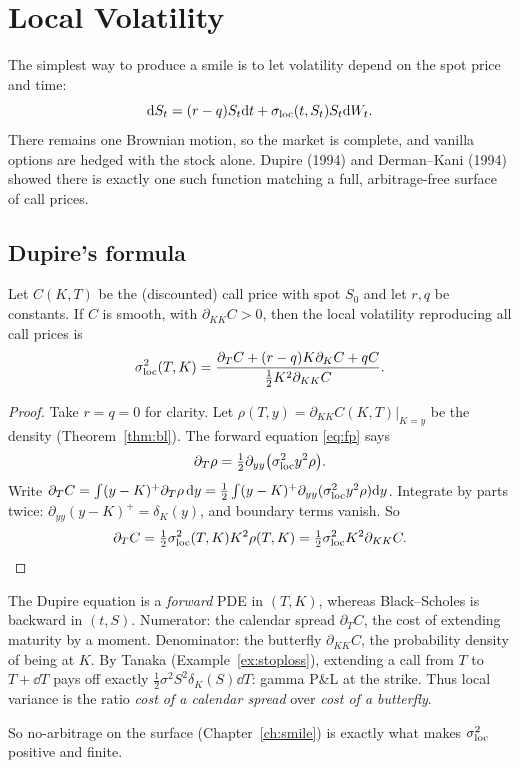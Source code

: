 \chapter{Local Volatility}\label{ch:localvol}

The simplest way to produce a smile is to let volatility depend on the spot price and time:
\[
\mathrm{d} S_t=(r-q)S_t\mathrm{d} t+\sigma_{\rm loc}(t,S_t)S_t\mathrm{d} W_t.
\]
There remains one Brownian motion, so the market is complete, and vanilla options are hedged with the stock alone. Dupire (1994) and Derman--Kani (1994) showed there is exactly one such function matching a full, arbitrage-free surface of call prices.

\section{Dupire's formula}

\begin{theorem}[Dupire]\label{thm:dupire}
Let $C(K,T)$ be the (discounted) call price with spot $S_0$ and let $r,q$ be constants. If $C$ is smooth, with $\partial_{KK}C>0$, then the local volatility reproducing all call prices is
\[
\sigma_{\rm loc}^2(T,K)=\frac{\partial_TC+(r-q)K\partial_KC+qC}{\tfrac12K^2\partial_{KK}C}.
\]
\end{theorem}
\begin{proof}
Take $r=q=0$ for clarity. Let $\rho(T,y)=\partial_{KK}C(K,T)|_{K=y}$ be the density (Theorem~\ref{thm:bl}). The forward equation \eqref{eq:fp} says
\[
\partial_T\rho=\tfrac12\partial_{yy}\bigl(\sigma_{\rm loc}^2y^2\rho\bigr).
\]
Write $\partial_TC=\int(y-K)^+\partial_T\rho\,\mathrm{d} y=\tfrac12\int(y-K)^+\partial_{yy}(\sigma_{\rm loc}^2y^2\rho)\mathrm{d} y$. Integrate by parts twice: $\partial_{yy}(y-K)^+=\delta_K(y)$, and boundary terms vanish. So
\[
\partial_TC=\tfrac12\sigma_{\rm loc}^2(T,K)K^2\rho(T,K)=\tfrac12\sigma_{\rm loc}^2K^2\partial_{KK}C.
\]
\end{proof}

\begin{intuition}
The Dupire equation is a \emph{forward} PDE in $(T,K)$, whereas Black--Scholes is backward in $(t,S)$. Numerator: the calendar spread $\partial_TC$, the cost of extending maturity by a moment. Denominator: the butterfly $\partial_{KK}C$, the probability density of being at $K$. By Tanaka (Example~\ref{ex:stoploss}), extending a call from $T$ to $T+\dd T$ pays off exactly $\tfrac12\sigma^2S^2\delta_K(S)\dd T$: gamma P\&L at the strike. Thus local variance is the ratio \emph{cost of a calendar spread} over \emph{cost of a butterfly}.

So no-arbitrage on the surface (Chapter~\ref{ch:smile}) is exactly what makes $\sigma_{\rm loc}^2$ positive and finite.
\end{intuition}

